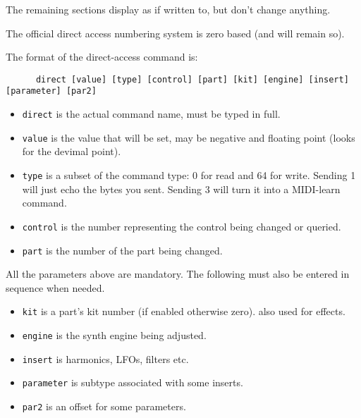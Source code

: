    The remaining sections display as if written to, but don't change anything.

   The official direct access numbering system is zero based (and will remain
   so).

%
%

   The format of the direct-access command is:

   \begin{verbatim}
      direct [value] [type] [control] [part] [kit] [engine] [insert] [parameter] [par2]
   \end{verbatim}

   \begin{itemize}
      \item \texttt{direct} is the actual command name, must be typed in full.
      \item \texttt{value} is the value that will be set, may be negative and
         floating point (looks for the devimal point).
      \item \texttt{type} is a subset of the command type: 0 for read and 64 for
         write. Sending 1 will just echo the bytes you sent.  Sending 3 will
         turn it into a MIDI-learn command.
      \item \texttt{control} is the number representing the control being
         changed or queried.
      \item \texttt{part} is the number of the part being changed.
   \end{itemize}

   All the parameters above are mandatory. The following must also be entered in
   sequence when needed.

   \begin{itemize}
      \item \texttt{kit} is a part's kit number (if enabled otherwise zero).
         also used for effects.
      \item \texttt{engine} is the synth engine being adjusted.
      \item \texttt{insert} is harmonics, LFOs, filters etc.
      \item \texttt{parameter} is subtype associated with some inserts.
      \item \texttt{par2} is an offset for some parameters.
   \end{itemize}

